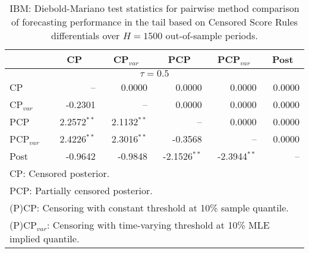 { \renewcommand{\arraystretch}{1.2} 
\begin{table} 
\center 
\begin{tabular}{l | rrrrr} 
& \multicolumn{1}{c}{CP}& \multicolumn{1}{c}{CP$_{var}$}& \multicolumn{1}{c}{PCP}& \multicolumn{1}{c}{PCP$_{var}$}& \multicolumn{1}{c}{Post} \\ \hline 
\multicolumn{6}{c}{$\tau = 0.5$} \\ \hline 
CP &    --\phantom{$^{***}$} & 0.0000\phantom{$^{***}$} & 0.0000\phantom{$^{***}$} & 0.0000\phantom{$^{***}$} & 0.0000\phantom{$^{***}$}   \\ 
CP$_{var}$ & -0.2301\phantom{$^{***}$} &    --\phantom{$^{***}$} & 0.0000\phantom{$^{***}$} & 0.0000\phantom{$^{***}$} & 0.0000\phantom{$^{***}$}   \\ 
PCP & 2.2572$^{**}$\phantom{$^{*}$} & 2.1132$^{**}$\phantom{$^{*}$} &    --\phantom{$^{***}$} & 0.0000\phantom{$^{***}$} & 0.0000\phantom{$^{***}$}   \\ 
PCP$_{var}$ & 2.4226$^{**}$\phantom{$^{*}$} & 2.3016$^{**}$\phantom{$^{*}$} & -0.3568\phantom{$^{***}$} &    --\phantom{$^{***}$} & 0.0000\phantom{$^{***}$}   \\ 
Post & -0.9642\phantom{$^{***}$} & -0.9848\phantom{$^{***}$} & -2.1526$^{**}$\phantom{$^{*}$} & -2.3944$^{**}$\phantom{$^{*}$} &    --\phantom{$^{***}$}   \\ 
\hline 
\multicolumn{6}{l}{\footnotesize{CP: Censored posterior.}}  \\ 
\multicolumn{6}{l}{\footnotesize{PCP: Partially censored posterior.}} \\ 
\multicolumn{6}{l}{\footnotesize{(P)CP: Censoring with constant threshold at 10\% sample quantile.}}  \\ 
\multicolumn{6}{l}{\footnotesize{(P)CP$_{var}$: Censoring with time-varying threshold at 10\% MLE implied quantile.}} \\ 
\end{tabular}
 \caption{IBM: Diebold-Mariano test statistics for  pairwise method comparison of forecasting performance in the tail based on  Censored Score Rules differentials over $H=1500$ out-of-sample periods. }
\label{tab:IBM_DMv_0.5}  
\end{table}
}
